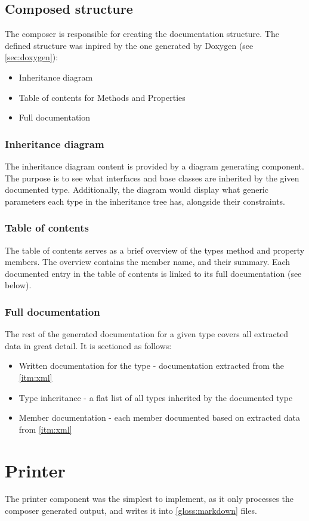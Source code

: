 \subsection{Composed structure}

The composer is responsible for creating the documentation structure. The defined structure was inpired by the one generated by Doxygen (see \ref{sec:doxygen}):
\begin{itemize}
    \item Inheritance diagram
    \item Table of contents for Methods and Properties
    \item Full documentation
\end{itemize}

\subsubsection{Inheritance diagram}

The inheritance diagram content is provided by a diagram generating component. The purpose is to see what interfaces and base classes are inherited by the given documented type. Additionally, the diagram would display what generic parameters each type in the inheritance tree has, alongside their constraints.

\subsubsection{Table of contents}

The table of contents serves as a brief overview of the types method and property members. The overview contains the member name, and their summary. Each documented entry in the table of contents is linked to its full documentation (see below).

\subsubsection{Full documentation}

The rest of the generated documentation for a given type covers all extracted data in great detail. It is sectioned as follows:
\begin{itemize}
    \item Written documentation for the type - documentation extracted from the \ref{itm:xml}
    \item Type inheritance - a flat list of all types inherited by the documented type
    \item Member documentation - each member documented based on extracted data from \ref{itm:xml}
\end{itemize}

\section{Printer}

The printer component was the simplest to implement, as it only processes the composer generated output, and writes it into \ref{gloss:markdown} files.